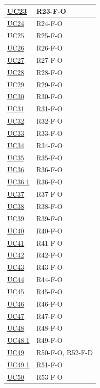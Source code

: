 \begin{longtable}{|p{2.8cm}|p{10.2cm}|}
	\hyperlink{uc23}{UC23}   & R23-F-O \\ \hline
	\hyperlink{uc24}{UC24}   & R24-F-O \\ \hline
	\hyperlink{uc25}{UC25}   & R25-F-O \\ \hline
	\hyperlink{uc26}{UC26}   & R26-F-O \\ \hline
	\hyperlink{uc27}{UC27}   & R27-F-O \\ \hline
	\hyperlink{uc28}{UC28}   & R28-F-O \\ \hline
	\hyperlink{uc29}{UC29}   & R29-F-O \\ \hline
	\hyperlink{uc30}{UC30}   & R30-F-O \\ \hline
	\hyperlink{uc31}{UC31}   & R31-F-O \\ \hline
	\hyperlink{uc32}{UC32}   & R32-F-O \\ \hline
	\hyperlink{uc33}{UC33}   & R33-F-O \\ \hline
	\hyperlink{uc34}{UC34}   & R34-F-O \\ \hline
	\hyperlink{uc35}{UC35}   & R35-F-O \\ \hline
	\hyperlink{uc36}{UC36}   & R36-F-O \\ \hline
	\hyperlink{uc36.1}{UC36.1} & R36-F-O \\ \hline
	\hyperlink{uc37}{UC37}   & R37-F-O \\ \hline
	\hyperlink{uc38}{UC38}   & R38-F-O \\ \hline
	\hyperlink{uc39}{UC39}   & R39-F-O \\ \hline
	\hyperlink{uc40}{UC40}   & R40-F-O \\ \hline
	\hyperlink{uc41}{UC41}   & R41-F-O \\ \hline
	\hyperlink{uc42}{UC42}   & R42-F-O \\ \hline
	\hyperlink{uc43}{UC43}   & R43-F-O \\ \hline
	\hyperlink{uc44}{UC44}   & R44-F-O \\ \hline
	\hyperlink{uc45}{UC45}   & R45-F-O \\ \hline
	\hyperlink{uc46}{UC46}   & R46-F-O \\ \hline
	\hyperlink{uc47}{UC47}   & R47-F-O \\ \hline
	\hyperlink{uc48}{UC48}   & R48-F-O \\ \hline
	\hyperlink{uc48.1}{UC48.1} & R49-F-O \\ \hline
	\hyperlink{uc49}{UC49}   & R50-F-O, R52-F-D \\ \hline
	\hyperlink{uc49.1}{UC49.1} & R51-F-O \\ \hline
	\hyperlink{uc50}{UC50}   & R53-F-O \\ \hline

\end{longtable}

